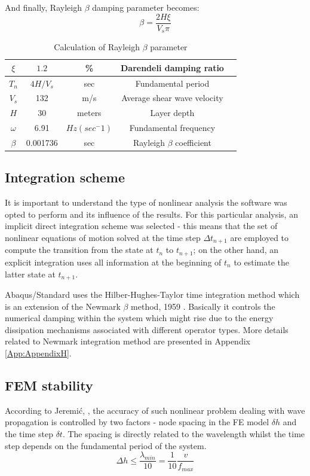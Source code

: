 	And finally, Rayleigh $\beta$ damping parameter becomes:
	\begin{equation}
	\beta=\frac{2H\xi}{V_s\pi}
	\end{equation}
	
	\begin{table}[h!]
		\centering
		\begin{tabular}{|c|c|c|c|c|}
			\hline $\xi$         &       $1.2$    &  \%    &  Darendeli damping ratio      \\ 
			\hline $T_n$    & $4H/V_s$ &  sec &  Fundamental period\\ 
			\hline $V_s$  & 132  &  m/s &  Average shear wave velocity\\ 
			\hline $H$ & 30 &  meters &  Layer depth\\
			\hline $\omega$ & 6.91 & $Hz (sec^-1)$ & Fundamental frequency\\
			\hline $\beta$ & 0.001736 & sec & Rayleigh $\beta$ coefficient\\
			\hline
		\end{tabular} 
		\caption{Calculation of Rayleigh $\beta$ parameter}
		\label{beta_param}
	\end{table}
	
	\subsection{Integration scheme}
	It is important to understand the type of nonlinear analysis the software was opted to perform and its influence of the results. For this particular analysis, an implicit direct integration scheme was selected - this means that the set of nonlinear equations of motion solved at the time step $\Delta t_{n+1}$ are employed to compute the transition from the state at $t_n$ to $t_{n+1}$; on the other hand, an explicit integration uses all information at the beginning of $t_n$ to estimate the latter state at $t_{n+1}$.
	
	Abaqus/Standard uses the Hilber-Hughes-Taylor time integration method \cite{hilber1977improved} which is an extension of the Newmark $\beta$ method, 1959 \cite{newmark1959method}. Basically it controls the numerical damping within the system which might rise due to the energy dissipation mechanisms associated with different operator types. More details related to Newmark integration method are presented in Appendix \ref{App:AppendixH}.
	
	\subsection{FEM stability}
	According to Jeremi\'{c}, \cite{jeremic2009time}, the accuracy of such nonlinear problem dealing with wave propagation is controlled by two factors - node spacing in the FE model $\delta h$ and the time step $\delta t$. The spacing is directly related to the wavelength whilst the time step depends on the fundamental period of the system. 
	\begin{equation}
	\Delta h\leq\frac{\lambda_{min}}{10}=\frac{1}{10} \frac{v}{f_{max}}
	\end{equation}
	
